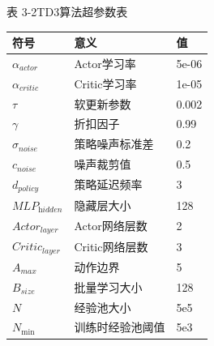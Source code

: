 \documentclass{scrbook}
\begin{document}
{{\centering 表 3-2TD3算法超参数表\label{ref-050}

\par}
\begin{table}
\begin{tabularx}{\textwidth}{|p{}|p{}|p{}|} \hline 
\raggedright\arraybackslash{}符号 & \raggedright\arraybackslash{}意义 & \raggedright\arraybackslash{}值\\\hline 
$\alpha _{\textit{actor}}$ & \raggedright\arraybackslash{}Actor学习率 & \raggedright\arraybackslash{}5e-06\\\hline 
$\alpha _{\textit{critic}}$ & \raggedright\arraybackslash{}Critic学习率 & \raggedright\arraybackslash{}1e-05\\\hline 
$\tau $ & \raggedright\arraybackslash{}软更新参数 & \raggedright\arraybackslash{}0.002\\\hline 
$\gamma $ & \raggedright\arraybackslash{}折扣因子 & \raggedright\arraybackslash{}0.99\\\hline 
$\sigma _{\textit{noise}}$ & \raggedright\arraybackslash{}策略噪声标准差 & \raggedright\arraybackslash{}0.2\\\hline 
$c_{\textit{noise}}$ & \raggedright\arraybackslash{}噪声裁剪值 & \raggedright\arraybackslash{}0.5\\\hline 
$d_{\textit{policy}}$ & \raggedright\arraybackslash{}策略延迟频率 & \raggedright\arraybackslash{}3\\\hline 
$MLP_{\textit{hidden}}$ & \raggedright\arraybackslash{}隐藏层大小 & \raggedright\arraybackslash{}128\\\hline 
$Actor_{\textit{layer}}$ & \raggedright\arraybackslash{}Actor网络层数 & \raggedright\arraybackslash{}2\\\hline 
$\textit{Criti}c_{\textit{layer}}$ & \raggedright\arraybackslash{}Critic网络层数 & \raggedright\arraybackslash{}3\\\hline 
$A_{max}$ & \raggedright\arraybackslash{}动作边界 & \raggedright\arraybackslash{}5\\\hline 
$B_{size}$ & \raggedright\arraybackslash{}批量学习大小 & \raggedright\arraybackslash{}128\\\hline 
$N$ & \raggedright\arraybackslash{}经验池大小 & \raggedright\arraybackslash{}5e5\\\hline 
$N_{\min }$ & \raggedright\arraybackslash{}训练时经验池阈值 & \raggedright\arraybackslash{}5e3\\\hline 
\end{tabularx}
\end{table}
}
\end{document}
